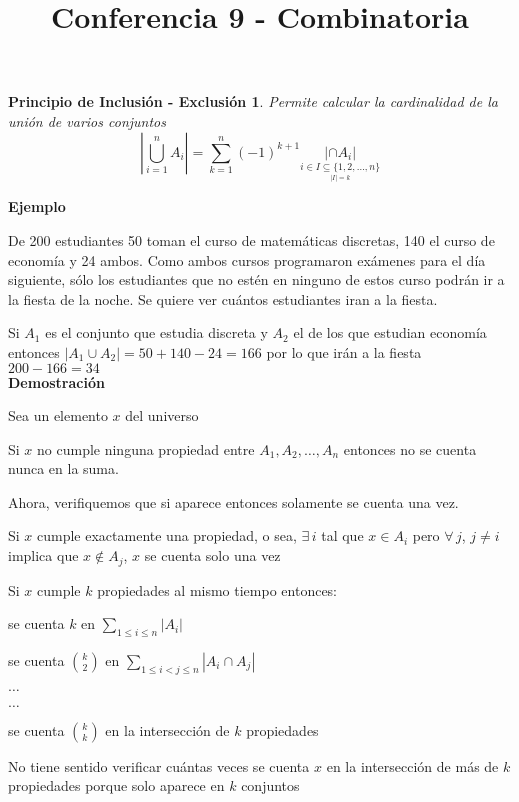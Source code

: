 \documentclass[a4paper,12pt]{report}
\title{Conferencia 9 - Combinatoria}
\author{}
\newtheorem*{pie}{Principio de Inclusión - Exclusión}
\begin{document}
\maketitle


\begin{pie}
Permite calcular la cardinalidad de la unión de varios conjuntos\\
 $$|\bigcup^n_{i=1}A_i|=\sum^n_{k=1}(-1)^{k+1} \underset{\underset{|I|=k}{i\in I\subseteq\{1,2,\dots,n\}}}{|\cap A_i|}$$
\end{pie}

\textbf{Ejemplo}

De 200 estudiantes 50 toman el curso de matemáticas discretas, 140 el curso de economía y 24 ambos. Como ambos cursos programaron exámenes para el día siguiente, sólo los estudiantes que no est\'en en ninguno de estos curso podrán ir a la fiesta de la noche. Se quiere ver cuántos estudiantes iran a la fiesta.

Si $A_1$ es el conjunto que estudia discreta y $A_2$ el de los que estudian economía entonces $|A_1\cup A_2|=50+140-24=166$ por lo que irán a la fiesta $200-166=34$\\


\textbf{Demostración}

Sea un elemento $x$ del universo

Si $x$ no cumple ninguna propiedad entre $A_1,A_2,\dots,A_n$ entonces no se cuenta nunca en la suma.

Ahora, verifiquemos que si aparece entonces solamente se cuenta una vez.

Si $x$ cumple exactamente una propiedad, o sea, $\exists \, i$ tal que  $x\in A_i$ pero $\forall \, j$, $j\neq i$ implica que $x\not \in A_j$, $x$ se cuenta solo una vez

Si $x$ cumple $k$ propiedades al mismo tiempo entonces:

se cuenta $k$ en $\sum_{1\leq i \leq n}|A_i|$

se cuenta ${k}\choose{2}$ en $\sum_{1\leq i < j\leq n}|A_i\cap A_j|$

$\dots$

$\dots$

se cuenta ${k}\choose{k}$ en la intersección de $k$ propiedades

No tiene sentido verificar cuántas veces se cuenta $x$ en la intersección de más de $k$ propiedades porque solo aparece en $k$ conjuntos
\end{document}
